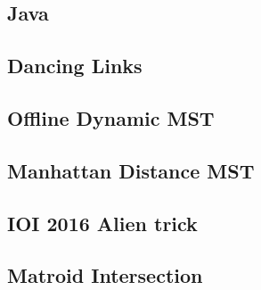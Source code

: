 \documentclass[a4paper,10pt,twocolumn,oneside]{article}
\begin{document}
\subsection{Java}

\subsection{Dancing Links}

\subsection{Offline Dynamic MST}

\subsection{Manhattan Distance MST}

% 
% 
\subsection{IOI 2016 Alien trick}

\subsection{Matroid Intersection}

% 
\end{document}

